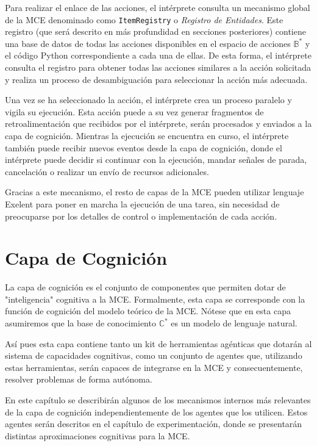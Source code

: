 Para realizar el enlace de las acciones, el intérprete consulta un mecanismo global
de la MCE denominado como \texttt{ItemRegistry} o \emph{Registro de Entidades}. 
Este registro (que será descrito en más profundidad en secciones posteriores) contiene una 
base de datos de todas las acciones disponibles en el espacio de acciones \(\mathbb{B}^*\) y
el código Python correspondiente a cada una de ellas. De esta forma, el intérprete
consulta el registro para obtener todas las acciones similares a la acción solicitada y
realiza un proceso de desambiguación para seleccionar la acción más adecuada.

Una vez se ha seleccionado la acción, el intérprete crea un proceso paralelo y vigila 
su ejecución. Esta acción puede a su vez generar fragmentos de retroalimentación que 
recibidos por el intérprete, serán procesados y enviados a la capa de cognición. Mientras
la ejecución se encuentra en curso, el intérprete también puede recibir nuevos eventos
desde la capa de cognición, donde el intérprete puede decidir si continuar con la ejecución,
mandar señales de parada, cancelación o realizar un envío de recursos adicionales.

Gracias a este mecanismo, el resto de capas de la MCE pueden utilizar lenguaje Exelent para
poner en marcha la ejecución de una tarea, sin necesidad de preocuparse por los detalles
de control o implementación de cada acción.

\section{Capa de Cognición}

La capa de cognición es el conjunto de componentes que permiten dotar de 
"inteligencia" cognitiva a la MCE. Formalmente, esta capa se corresponde 
con la función de cognición del modelo teórico de la MCE. Nótese que en esta capa
asumiremos que la base de conocimiento \(\mathbb{C}^*\) es un modelo de lenguaje
natural.

Así pues esta capa contiene tanto un kit de herramientas agénticas que dotarán
al sistema de capacidades cognitivas, como un conjunto de agentes que,
utilizando estas herramientas, serán capaces de integrarse en la MCE y consecuentemente, 
resolver problemas de forma autónoma.

En este capítulo se describirán algunos de los mecanismos internos más 
relevantes de la capa de cognición independientemente de los agentes que los utilicen. Estos agentes serán
descritos en el capítulo de experimentación, donde se presentarán distintas
aproximaciones cognitivas para la MCE.

